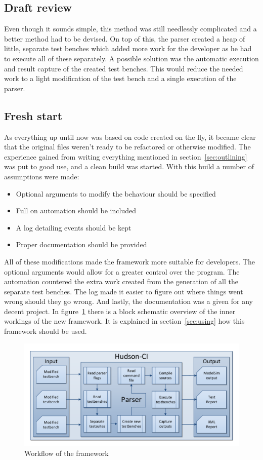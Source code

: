 \documentclass[11pt,british]{article}
\begin{document}
\subsection{Draft review}
\label{subsec:review}
Even though it sounds simple, this method was still needlessly complicated and a better method had to be devised. On top of this, the parser created a heap of little, separate test benches which added more work for the developer as he had to execute all of these separately. A possible solution was the automatic execution and result capture of the created test benches. This would reduce the needed work to a light modification of the test bench and a single execution of the parser.

\subsection{Fresh start}
As everything up until now was based on code created on the fly, it became clear that the original files weren't ready to be refactored or otherwise modified. The experience gained from writing everything mentioned in section~\ref{sec:outlining} was put to good use, and a clean build was started. With this build a number of assumptions were made:
\begin{itemize}
\item Optional arguments to modify the behaviour should be specified
\item Full on automation should be included
\item A log detailing events should be kept
\item Proper documentation should be provided
\end{itemize}
All of these modifications made the framework more suitable for developers. The optional arguments would allow for a greater control over the program. The automation countered the extra work created from the generation of all the separate test benches. The log made it easier to figure out where things went wrong should they go wrong. And lastly, the documentation was a given for any decent project. In figure~\ref{fig:fullwork} there is a block schematic overview of the inner workings of the new framework. It is explained in section~\ref{sec:using} how this framework should be used.

\begin{figure}[h]
    \centering
	\includegraphics[width=\textwidth]{images/fullwork.pdf}
    \caption{Workflow of the framework}
    \label{fig:fullwork}
\end{figure}
\end{document}

